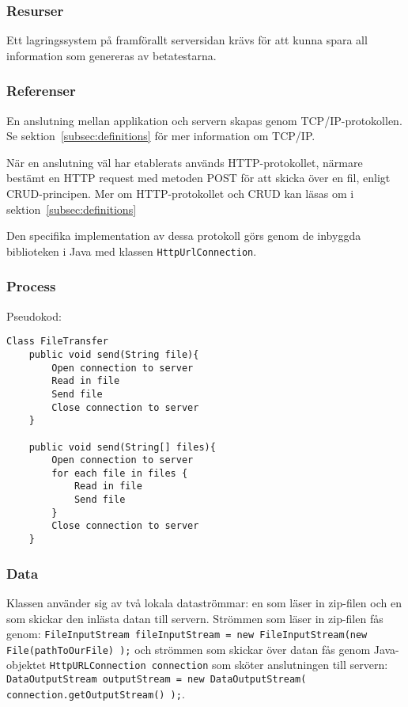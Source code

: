 \subsubsection{Resurser}
Ett lagringssystem på framförallt serversidan krävs för att kunna spara all information som genereras av betatestarna. 

\subsubsection{Referenser}
En anslutning mellan applikation och servern skapas genom TCP/IP-protokollen. Se sektion~\ref{subsec:definitions} för mer information om TCP/IP. 

När en anslutning väl har etablerats används HTTP-protokollet, närmare bestämt en HTTP request med metoden POST för att skicka över en fil, enligt CRUD-principen. Mer om HTTP-protokollet och CRUD kan läsas om i sektion~\ref{subsec:definitions}

Den specifika implementation av dessa protokoll görs genom de inbyggda biblioteken i Java med klassen \verb:HttpUrlConnection:. 

\subsubsection{Process}
Pseudokod: 
\begin{verbatim}
Class FileTransfer
	public void send(String file){
		Open connection to server
		Read in file
		Send file
		Close connection to server
	}
	
	public void send(String[] files){
		Open connection to server
		for each file in files {
			Read in file
			Send file		
		}
		Close connection to server
	}
\end{verbatim}

\subsubsection{Data}
Klassen använder sig av två lokala dataströmmar: en som läser in zip-filen och en som skickar den inlästa datan till servern. Strömmen som läser in zip-filen fås genom: \verb:FileInputStream fileInputStream = new FileInputStream(new File(pathToOurFile) );: och strömmen som skickar över datan fås genom Java-objektet \verb:HttpURLConnection connection: som sköter anslutningen till servern: \verb:DataOutputStream outputStream = new DataOutputStream( connection.getOutputStream() );:. 